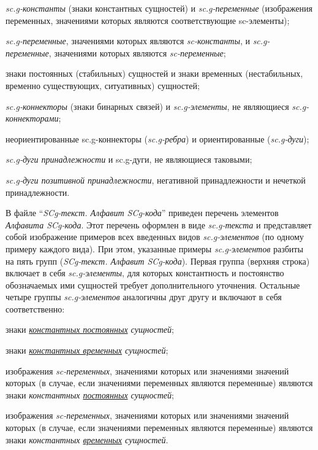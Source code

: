\begin{SCn}
{	\begin{scnitemize}
		\item \textit{sc.g-константы} (знаки константных сущностей) и \textit{sc.g-переменные} (изображения переменных, значениями которых являются соответствующие sc-элементы);
		\item \textit{sc.g-переменные}, значениями которых являются \textit{sc-константы}, и \textit{sc.g-переменные}, значениями которых являются \textit{sc-переменные};
		\item знаки постоянных (стабильных) сущностей и знаки временных (нестабильных, временно существующих, ситуативных) сущностей;
		\item \textit{sc.g-коннекторы} (знаки бинарных связей) и \textit{sc.g-элементы}, не являющиеся \textit{sc.g-коннекторами};
		\item неориентированные sc.g-коннекторы (\textit{sc.g-ребра}) и ориентированные (\textit{sc.g-дуги});
		\item \textit{sc.g-дуги принадлежности} и sc.g-дуги, не являющиеся таковыми;
		\item \textit{sc.g-дуги позитивной принадлежности}, негативной принадлежности и нечеткой принадлежности.
	\end{scnitemize}
	
	В файле ``\textit{SCg-текст. Алфавит SCg-кода}'' приведен перечень элементов \textit{Алфавита SCg-кода}.
	Этот перечень оформлен в виде \textit{sc.g-текста} и представляет собой изображение примеров всех введенных видов \textit{sc.g-элементов} (по одному примеру каждого вида). При этом, указанные примеры \textit{sc.g-элементов} разбиты на пять групп (\textit{SCg-текст. Алфавит SCg-кода}). Первая группа (верхняя строка) включает в себя \textit{sc.g-элементы}, для которых константность и постоянство обозначаемых ими сущностей требует дополнительного уточнения. Остальные четыре группы \textit{sc.g-элементов} аналогичны друг другу и включают в себя соответственно:
	
	\begin{scnitemize}
		\item знаки \textit{\uline{константных постоянных} сущностей};
		\item знаки \textit{\uline{константных временных} сущностей};
		\item изображения \textit{sc-переменных}, значениями которых или значениями значений которых (в случае, если значениями переменных являются переменные) являются знаки \textit{константных \uline{постоянных} сущностей};
		\item изображения \textit{sc-переменных}, значениями которых или значениями значений которых (в случае, если значениями переменных являются переменные) являются знаки \textit{константных \uline{временных} сущностей}.
	\end{scnitemize}
	
}
\end{SCn}
